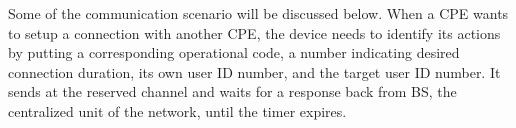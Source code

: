 Some of the communication scenario will be discussed below. When a CPE wants to setup a connection with another CPE, the device needs to 
identify its actions by putting a corresponding operational code, a number indicating desired connection duration, its own user ID number, and 
the target user ID number. It sends at the reserved channel and waits for a response back from BS, the centralized unit of the network, until the timer expires. 
\begin{figure}[ht]
 \hfill 	
\end{figure}
